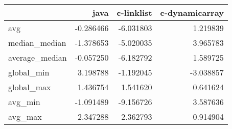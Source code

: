 \begin{tabular}{lrrr}
\toprule
{} &      java &  c-linklist &  c-dynamicarray \\
\midrule
avg            & -0.286466 &   -6.031803 &        1.219839 \\
median\_median  & -1.378653 &   -5.020035 &        3.965783 \\
average\_median & -0.057250 &   -6.182792 &        1.589725 \\
global\_min     &  3.198788 &   -1.192045 &       -3.038857 \\
global\_max     &  1.436754 &    1.541620 &        0.641624 \\
avg\_min        & -1.091489 &   -9.156726 &        3.587636 \\
avg\_max        &  2.347288 &    2.362793 &        0.914904 \\
\bottomrule
\end{tabular}
